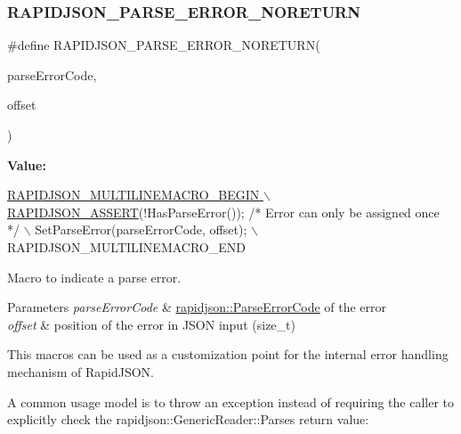 \subsubsection{\texorpdfstring{R\+A\+P\+I\+D\+J\+S\+O\+N\+\_\+\+P\+A\+R\+S\+E\+\_\+\+E\+R\+R\+O\+R\+\_\+\+N\+O\+R\+E\+T\+U\+RN}{RAPIDJSON\_PARSE\_ERROR\_NORETURN}\hspace{0.1cm}{\footnotesize\ttfamily [1/2]}}
{\footnotesize\ttfamily \#define R\+A\+P\+I\+D\+J\+S\+O\+N\+\_\+\+P\+A\+R\+S\+E\+\_\+\+E\+R\+R\+O\+R\+\_\+\+N\+O\+R\+E\+T\+U\+RN(\begin{DoxyParamCaption}\item[{}]{parse\+Error\+Code,  }\item[{}]{offset }\end{DoxyParamCaption})}

{\bfseries Value\+:}
\begin{DoxyCode}
\hyperlink{group__RAPIDJSON__CONFIG_gabeba18d612187bad2ac62aed9276d47c}{RAPIDJSON\_MULTILINEMACRO\_BEGIN \(\backslash\)}
\hyperlink{group__RAPIDJSON__CONFIG_gabeba18d612187bad2ac62aed9276d47c}{    RAPIDJSON\_ASSERT}(!HasParseError()); \textcolor{comment}{/* Error can only be assigned once */} \(\backslash\)
    SetParseError(parseErrorCode, offset); \(\backslash\)
    RAPIDJSON\_MULTILINEMACRO\_END
\end{DoxyCode}


Macro to indicate a parse error. 


\begin{DoxyParams}{Parameters}
{\em parse\+Error\+Code} & \hyperlink{group__RAPIDJSON__ERRORS_ga8d4b32dfc45840bca189ade2bbcb6ba7}{rapidjson\+::\+Parse\+Error\+Code} of the error \\
\hline
{\em offset} & position of the error in J\+S\+ON input ({\ttfamily size\+\_\+t})\\
\hline
\end{DoxyParams}
This macros can be used as a customization point for the internal error handling mechanism of Rapid\+J\+S\+ON.

A common usage model is to throw an exception instead of requiring the caller to explicitly check the rapidjson\+::\+Generic\+Reader\+::\+Parse\textquotesingle{}s return value\+:


